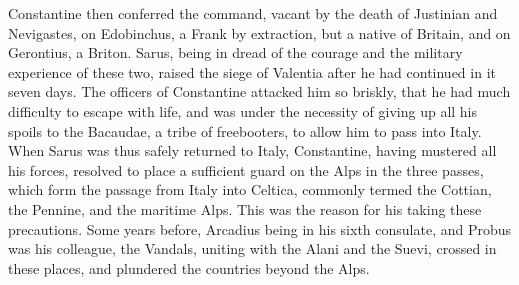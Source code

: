 Constantine then conferred the command, vacant by the death of Justinian and Nevigastes, on Edobinchus, a Frank by extraction, but a native of Britain, and on Gerontius, a Briton. Sarus, being in dread of the courage and the military experience of these two, raised the siege of Valentia after he had continued in it seven days. The officers of Constantine attacked him so briskly, that he had much difficulty to escape with life, and was under the necessity of giving up all his spoils to the Bacaudae, a tribe of freebooters, to allow him to pass into Italy. When Sarus was thus safely returned to Italy, Constantine, having mustered all his forces, resolved to place a sufficient guard on the Alps in the three passes, which form the passage from Italy into Celtica, commonly termed the Cottian, the Pennine, and the maritime Alps. This was the reason for his taking these precautions. Some years before, Arcadius being in his sixth consulate, and Probus was his colleague, the Vandals, uniting with the Alani and the Suevi, crossed in these places, and plundered the countries beyond the Alps.

